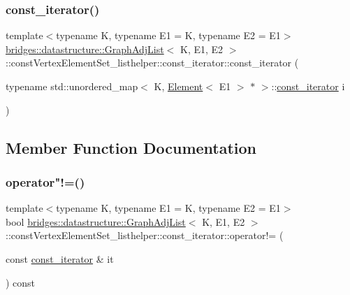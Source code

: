 \subsubsection{\texorpdfstring{const\+\_\+iterator()}{const\_iterator()}}
{\footnotesize\ttfamily template$<$typename K, typename E1 = K, typename E2 = E1$>$ \\
\hyperlink{classbridges_1_1datastructure_1_1_graph_adj_list}{bridges\+::datastructure\+::\+Graph\+Adj\+List}$<$ K, E1, E2 $>$\+::const\+Vertex\+Element\+Set\+\_\+listhelper\+::const\+\_\+iterator\+::const\+\_\+iterator (\begin{DoxyParamCaption}\item[{typename std\+::unordered\+\_\+map$<$ K, \hyperlink{classbridges_1_1datastructure_1_1_element}{Element}$<$ E1 $>$ $\ast$ $>$\+::\hyperlink{classbridges_1_1datastructure_1_1_graph_adj_list_1_1const_vertex_element_set__listhelper_1_1const__iterator}{const\+\_\+iterator}}]{i }\end{DoxyParamCaption})\hspace{0.3cm}{\ttfamily [inline]}}



\subsection{Member Function Documentation}
\mbox{\label{classbridges_1_1datastructure_1_1_graph_adj_list_1_1const_vertex_element_set__listhelper_1_1const__iterator_ac30d7d7e8eb8a976f7dd193bc7cb7b1c}} 
\subsubsection{\texorpdfstring{operator"!=()}{operator!=()}}
{\footnotesize\ttfamily template$<$typename K, typename E1 = K, typename E2 = E1$>$ \\
bool \hyperlink{classbridges_1_1datastructure_1_1_graph_adj_list}{bridges\+::datastructure\+::\+Graph\+Adj\+List}$<$ K, E1, E2 $>$\+::const\+Vertex\+Element\+Set\+\_\+listhelper\+::const\+\_\+iterator\+::operator!= (\begin{DoxyParamCaption}\item[{const \hyperlink{classbridges_1_1datastructure_1_1_graph_adj_list_1_1const_vertex_element_set__listhelper_1_1const__iterator}{const\+\_\+iterator} \&}]{it }\end{DoxyParamCaption}) const\hspace{0.3cm}{\ttfamily [inline]}}

